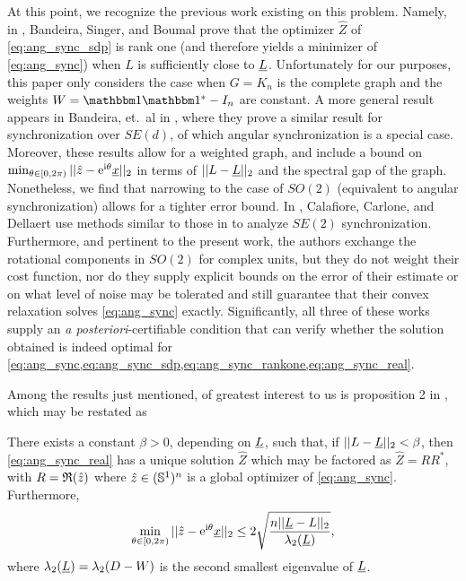 
At this point, we recognize the previous work existing on this problem.  Namely, in \cite{bandeira2016tightness}, Bandeira, Singer, and Boumal prove that the optimizer $\hat{Z}$ of \eqref{eq:ang_sync_sdp} is rank one (and therefore yields a minimizer of \eqref{eq:ang_sync}) when $L$ is sufficiently close to $\underline{L}$.  Unfortunately for our purposes, this paper only considers the case when $G = K_n$ is the complete graph and the weights $W = \one \one^* - I_n$ are constant.  A more general result appears in Bandeira, et.~al in \cite{bandeira2016se_sync}, where they prove a similar result for synchronization over $SE(d)$, of which angular synchronization is a special case.  Moreover, these results allow for a weighted graph, and include a bound on $\min_{\theta \in [0, 2\pi)} ||\hat{z} - \mathrm{e}^{\mathrm{i}\theta} \underline{x}||_2$ in terms of $||L - \underline{L}||_2$ and the spectral gap of the graph.  Nonetheless, we find that narrowing to the case of $SO(2)$ (equivalent to angular synchronization) allows for a tighter error bound.  In \cite{calafiore2016complex_pgo}, Calafiore, Carlone, and Dellaert use methods similar to those in \cite{bandeira2016se_sync} to analyze $SE(2)$ synchronization.  Furthermore, and pertinent to the present work, the authors exchange the rotational components in $SO(2)$ for complex units, but they do not weight their cost function, nor do they supply explicit bounds on the error of their estimate or on what level of noise may be tolerated and still guarantee that their convex relaxation solves \eqref{eq:ang_sync} exactly.  Significantly, all three of these works supply an \emph{a posteriori}-certifiable condition that can verify whether the solution obtained is indeed optimal for \cref{eq:ang_sync,eq:ang_sync_sdp,eq:ang_sync_rankone,eq:ang_sync_real}.

Among the results just mentioned, of greatest interest to us is proposition 2 in \cite{bandeira2016se_sync}, which may be restated as

\begin{proposition}
  There exists a constant $\beta > 0$, depending on $\underline{L}$, such that, if $||L - \underline{L}||_2 < \beta$, then \eqref{eq:ang_sync_real} has a unique solution $\hat{Z}$ which may be factored as $\hat{Z} = R R^*$, with $R = \mathfrak{R}(\hat{z})$ where $\hat{z} \in (\mathbb{S}^1)^n$ is a global optimizer of \eqref{eq:ang_sync}.  Furthermore, \[\min_{\theta \in [0, 2\pi)} ||\hat{z} - \mathrm{e}^{\mathrm{i} \theta} \underline{x}||_2 \le 2 \sqrt{\dfrac{n ||\underline{L} - L||_2}{\lambda_2(\underline{L})}},\] where $\lambda_2(\underline{L}) = \lambda_2(D - W)$ is the second smallest eigenvalue of $\underline{L}$.
\end{proposition}


